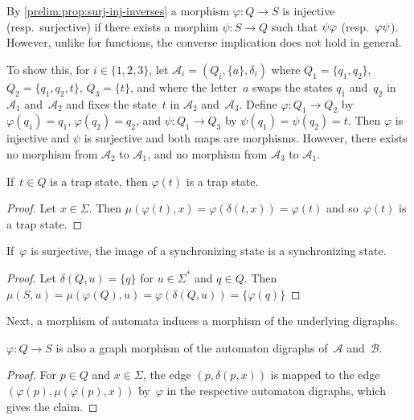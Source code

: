 \begin{remark}
	By \cref{prelim:prop:surj-inj-inverses} 
	a morphism $\varphi \colon Q \to S$
	is injective (resp.~surjective) if
	there exists a morphim $\psi \colon S \to Q$
	such that $\psi \varphi$ (resp.~$\varphi \psi$).
	However, unlike for functions,
	the converse implication does not hold in general.	

	To show this, for $i \in \{1,2,3\}$, let $\mathcal A_i = (Q_i, \{a\}, \delta_i)$
	where $Q_1 = \{ q_1, q_2 \}$, $Q_2 = \{ q_1, q_2, t \}$, $Q_3 = \{t\}$,
	and where the letter~$a$ swaps the states $q_1$ and~$q_2$ in $\mathcal A_1$ and~$\mathcal A_2$
	and fixes the state~$t$ in $\mathcal A_2$ and~$\mathcal A_3$.	
	Define $\varphi \colon Q_1 \to Q_2$ by $\varphi(q_1)=q_1$, $\varphi(q_2)=q_2$,
	and $\psi \colon Q_1 \to Q_3$ by $\psi(q_1)=\psi(q_2)=t$.
	Then $\varphi$ is injective and $\psi$ is surjective
	and both maps are morphisms.	
	However, there exists no morphism from $\mathcal A_2$ to $\mathcal A_1$,
	and no morphism from $\mathcal A_3$ to $\mathcal A_1$.
\end{remark}

\begin{proposition} \label{prelim:aut:prop:morph:trap-to-trap}
	If~$t \in Q$ is a trap state, then $\varphi(t)$ is a trap state.
\end{proposition}
\begin{proof}
	Let $x \in \Sigma$.
	Then $\mu(\varphi(t), x) = \varphi(\delta(t,x)) = \varphi(t)$
	and so~$\varphi(t)$ is a trap state.
\end{proof}

\begin{proposition} \label{prelim:automata:morphism:prop:surj-morphism-preserves-sync}
	If~$\varphi$ is surjective, the image of a synchronizing state is a synchronizing state.
\end{proposition} 
\begin{proof}
	Let $\delta(Q, u) = \{q\}$ for $u \in \Sigma^*$ and $q \in Q$.
	Then $\mu(S, u) = \mu(\varphi(Q), u) = \varphi(\delta(Q,u)) = \{\varphi(q)\}$
\end{proof}

Next, a morphism of automata induces a morphism of the underlying digraphs.

\begin{proposition} \label{prelim:aut:prop:morph-digraph}
	$\varphi \colon Q \to S$ is also a graph morphism
	of the automaton digraphs of~$\mathcal A$ and~$\mathcal B$.
\end{proposition}
\begin{proof}
	For $p \in Q$ and $x \in \Sigma$, the edge $(p, \delta(p,x))$
	is mapped to the edge $(\varphi(p), \mu(\varphi(p), x))$
	by~$\varphi$ in the respective automaton digraphs,
	which gives the claim.
\end{proof}

